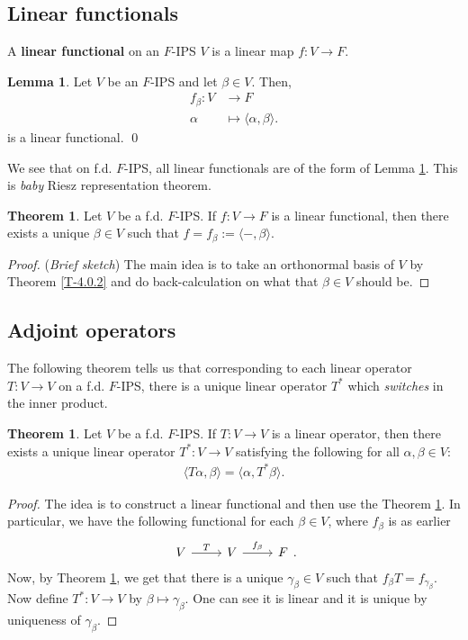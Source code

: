 \documentclass[letterpaper,11pt,twoside]{article}
\theoremstyle{definition}
\theoremstyle{definition}
\newtheorem{theorem}[proposition]{Theorem}
\theoremstyle{definition}
\theoremstyle{definition}
\newtheorem{lemma}[proposition]{\textbf{Lemma}}
\theoremstyle{definition}
\theoremstyle{definition}
\theoremstyle{remark}
\theoremstyle{definition}
\newcommand{\ip}[2]{\langle #1,#2 \rangle}
\begin{document}
    \subsection{Linear functionals}
    A \textbf{linear functional} on an $ F $-IPS $ V $ is a linear map $ f : V\to F $. 
   	\begin{lemma}\label{L-4.1.1}
   		Let $ V $ be an $ F $-IPS and let $ \beta \in V $. Then, 
   		\begin{align*}
   			f_{\beta} : V&\longrightarrow F\\
   			\alpha &\longmapsto \ip{\alpha}{\beta}.
   		\end{align*}
   		is a linear functional. \qed
   	\end{lemma}
    We see that on f.d. $ F $-IPS, all linear functionals are of the form of Lemma \ref{L-4.1.1}. This is \textit{baby} Riesz representation theorem.
    \begin{theorem}\label{T-4.1.2}
    	Let $ V $ be a f.d. $ F $-IPS. If $ f : V\to F $ is a linear functional, then there exists a unique $ \beta \in V $ such that $ f = f_\beta := \ip{-}{\beta} $.
    \end{theorem}
	\begin{proof} (\textit{Brief sketch})
		The main idea is to take an orthonormal basis of $ V $ by Theorem \ref{T-4.0.2} and do back-calculation on what that $ \beta\in V $ should be.
	\end{proof}
    \subsection{Adjoint operators}
    The following theorem tells us that corresponding to each linear operator $ T : V\to V $ on a f.d. $ F $-IPS, there is a unique linear operator $ T^{*} $ which \textit{switches} in the inner product.
    \begin{theorem}\label{T-4.2.1}
    	Let $ V $ be a f.d. $ F $-IPS. If $ T : V\to V $ is a linear operator, then there exists a unique linear operator $ T^{*} : V\to V$ satisfying the following for all $ \alpha,\beta\in V $:
    	\begin{align*}
    		\ip{T\alpha}{\beta} = \ip{\alpha}{T^{*} \beta}.
    	\end{align*}
    \end{theorem} 
\begin{proof}
	The idea is to construct a linear functional and then use the Theorem \ref{T-4.1.2}. In particular, we have the following functional for each $ \beta \in V$, where $ f_\beta $ is as earlier
	\[\begin{tikzcd}
		V & V & F
		\arrow["T", from=1-1, to=1-2]
		\arrow["{f_\beta}", from=1-2, to=1-3]
	\end{tikzcd}.\]
	Now, by Theorem \ref{T-4.1.2}, we get that there is a unique $ \gamma_{\beta} \in V $ such that $ f_\beta T = f_{\gamma_{\beta}} $. Now define $ T^{*} : V\to V $ by $ \beta \mapsto \gamma_{\beta} $. One can see it is linear and it is unique by uniqueness of $ \gamma_\beta $.
\end{proof}
	
\end{document}
